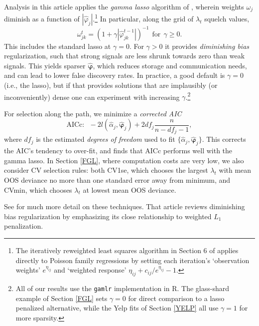 \documentclass[12pt]{article}
\newcommand{\bs}[1]{\boldsymbol{#1}}
\begin{document}
Analysis in this article applies the {\it gamma lasso} algorithm  of
\citet{taddy_gamma_2013}, wherein weights $\omega_j$ diminish as a
function of $|\hat\varphi_j|$.\footnote{The iteratively reweighted least
squares algorithm in Section 6 of \citet{taddy_gamma_2013} applies directly to Poisson
family regressions by setting each iteration's `observation weights' $e^{\eta_{ij}}$ and
`weighted response' $\eta_{ij} + c_{ij}/e^{\eta_{ij}} - 1$.}  In particular,
along the grid of $\lambda_t$ squelch values,
\begin{equation}\label{glweight}
\omega^{t}_{jk}  = \left(1 + \gamma
|\hat\varphi^{t-1}_{jk}|\right)^{-1} ~~\text{for}~~\gamma \geq 0.
\end{equation} 
This includes the standard lasso at $\gamma=0$.  For $\gamma>0$ it provides
{\it diminishing bias} regularization, such that strong signals are less
shrunk towards zero than  weak signals. This yields
sparser $\bs{\hat
\varphi}$, which reduces storage and communication needs, and can
 lead to lower false discovery rates.  In practice, a good default is
$\gamma=0$ (i.e., the lasso), but if that provides solutions that are implausibly (or inconveniently) dense one can experiment with increasing $\gamma$.\footnote{All of our
results use the {\tt gamlr} implementation in R.  The glass-shard example of
Section \ref{FGL} sets $\gamma=0$ for direct comparison to a lasso penalized
alternative, while the Yelp fits of Section \ref{YELP} all use $\gamma=1$ for
more sparsity.}

For selection along the path, we
minimize a {\it corrected AIC} \citep{hurvich_regression_1989}
\begin{equation}
\text{AICc:}~~~-2l(\hat\alpha_j,\bs{\hat\varphi}_j) + 2df_j\frac{n}{n-df_j-1},
\end{equation}
where $df_j$ is the estimated {\it degrees of freedom} used to fit
$\{\hat\alpha_j,\bs{\hat\varphi}_j\}$.  This corrects the AIC's tendency to
over-fit, and \cite{taddy_gamma_2013} finds that AICc performs well with the gamma lasso.   In Section
\ref{FGL}, where computation costs are very low, we also consider CV selection
rules: both CV1se, which chooses the largest $\lambda_t$ with mean OOS
deviance no more than one standard error away from  minimum, and CVmin,
which chooses $\lambda_t$ at lowest mean OOS deviance.

See \cite{taddy_gamma_2013} for much more detail on these techniques. That article reviews
diminishing bias  regularization by emphasizing its close relationship
to  weighted $L_1$ penalization.  
\end{document}
